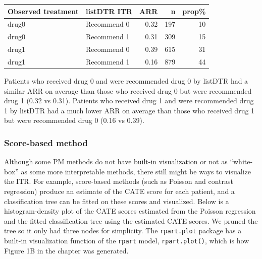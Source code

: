 \documentclass[
  letterpaper,
  DIV=11,
  numbers=noendperiod]{scrreprt}
\begin{document}
\begin{table}
\centering
\begin{tabular}{l|l|r|r|r}
\hline
Observed treatment & listDTR ITR & ARR & n & prop\%\\
\hline
drug0 & Recommend 0 & 0.32 & 197 & 10\\
\hline
drug0 & Recommend 1 & 0.31 & 309 & 15\\
\hline
drug1 & Recommend 0 & 0.39 & 615 & 31\\
\hline
drug1 & Recommend 1 & 0.16 & 879 & 44\\
\hline
\end{tabular}
\end{table}

Patients who received drug 0 and were recommended drug 0 by listDTR had
a similar ARR on average than those who received drug 0 but were
recommended drug 1 (0.32 vs 0.31). Patients who received drug 1 and were
recommended drug 1 by listDTR had a much lower ARR on average than those
who received drug 1 but were recommended drug 0 (0.16 vs 0.39).

\hypertarget{score-based-method}{%
\subsubsection{Score-based method}\label{score-based-method}}

Although some PM methods do not have built-in visualization or not as
``white-box'' as some more interpretable methods, there still might be
ways to visualize the ITR. For example, score-based methods (such as
Poisson and contrast regression) produce an estimate of the CATE score
for each patient, and a classification tree can be fitted on these
scores and visualized. Below is a histogram-density plot of the CATE
scores estimated from the Poisson regression and the fitted
classification tree using the estimated CATE scores. We pruned the tree
so it only had three nodes for simplicity. The \texttt{rpart.plot}
package has a built-in visualization function of the \texttt{rpart}
model, \texttt{rpart.plot()}, which is how Figure 1B in the chapter was
generated.
\end{document}
